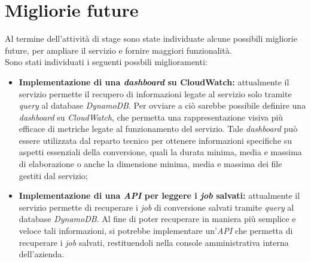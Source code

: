 \section{Migliorie future}
Al termine dell'attività di stage sono state individuate alcune possibili
migliorie future, per ampliare il servizio e fornire maggiori funzionalità. \\
Sono stati individuati i seguenti possbili miglioramenti:
\begin{itemize}
    \item \textbf{Implementazione di una \emph{dashboard} su CloudWatch:}
          attualmente il servizio permette il recupero di informazioni legate al
          servizio solo tramite \emph{query} al database \emph{DynamoDB}. Per ovviare
          a ciò sarebbe possibile definire una \emph{dashboard} su \emph{CloudWatch},
          che permetta una rappresentazione visiva più efficace di metriche legate al
          funzionamento del servizio. Tale \emph{dashboard} può essere utilizzata dal
          reparto tecnico per ottenere informazioni specifiche su aspetti essenziali
          della conversione, quali la durata minima, media e massima di elaborazione o
          anche la dimensione minima, media e massima dei file gestiti dal servizio;
    \item \textbf{Implementazione di una \emph{API} per leggere i \emph{job}
              salvati:} attualmente il servizio permette di recuperare i \emph{job} di
          conversione salvati tramite \emph{query} al database \emph{DynamoDB}. Al
          fine di poter recuperare in maniera più semplice e veloce tali informazioni,
          si potrebbe implementare un'\emph{API} che permetta di recuperare i
          \emph{job} salvati, restituendoli nella console amministrativa interna dell'azienda.
\end{itemize}
